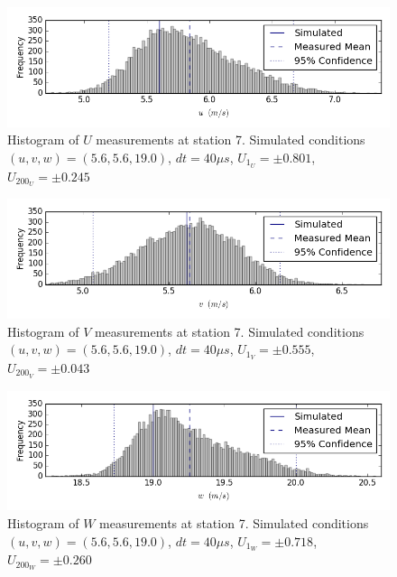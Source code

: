 \begin{figure}[H]
\centering
\includegraphics[width=6in]{figs/Ely_May28th07002/uncertainty_Ely_May28th07002_U}
\caption{Histogram of $U$ measurements at station 7. Simulated conditions $(u,v,w)=(5.6, 5.6, 19.0)$, $dt=40 \mu s$, $U_1_U=\pm 0.801$, $U_200_U=\pm 0.245$}
\label{fig:uncertainty_Ely_May28th07002_U}
\end{figure}


\begin{figure}[H]
\centering
\includegraphics[width=6in]{figs/Ely_May28th07002/uncertainty_Ely_May28th07002_V}
\caption{Histogram of $V$ measurements at station 7. Simulated conditions $(u,v,w)=(5.6, 5.6, 19.0)$, $dt=40 \mu s$, $U_1_V=\pm 0.555$, $U_200_V=\pm 0.043$}
\label{fig:uncertainty_Ely_May28th07002_V}
\end{figure}


\begin{figure}[H]
\centering
\includegraphics[width=6in]{figs/Ely_May28th07002/uncertainty_Ely_May28th07002_W}
\caption{Histogram of $W$ measurements at station 7. Simulated conditions $(u,v,w)=(5.6, 5.6, 19.0)$, $dt=40 \mu s$, $U_1_W=\pm 0.718$, $U_200_W=\pm 0.260$}
\label{fig:uncertainty_Ely_May28th07002_W}
\end{figure}


